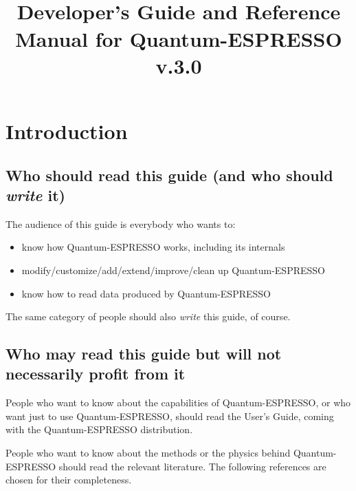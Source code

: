 \documentclass[12pt,a4paper]{article}
\def\version{3.0}
\begin{document}
 

\author{}
\date{}
\title{
  \hfill%
  \vspace{1.5cm}
  \\
  \huge Developer's Guide and Reference Manual for Quantum-ESPRESSO
       v.\version
}
\maketitle

\tableofcontents

\clearpage

\section{Introduction}

\subsection{Who should read this guide (and who should {\em write} it)}

The audience of this guide is everybody who wants to:
\begin{itemize}
  \item know how Quantum-ESPRESSO works, including its internals
  \item modify/customize/add/extend/improve/clean up Quantum-ESPRESSO
  \item know how to read data produced by Quantum-ESPRESSO
\end{itemize}
The same category of people should also {\em write} this guide, of course.

\subsection{Who may read this guide but will not necessarily
profit from it}

People who want to know about the capabilities of Quantum-ESPRESSO,
or who want just to use Quantum-ESPRESSO, should read the User's Guide, 
coming with the Quantum-ESPRESSO distribution.

People who want to know about the methods or the physics
behind Quantum-ESPRESSO should read the relevant literature. The
following references are chosen for their completeness.
\end{document}
